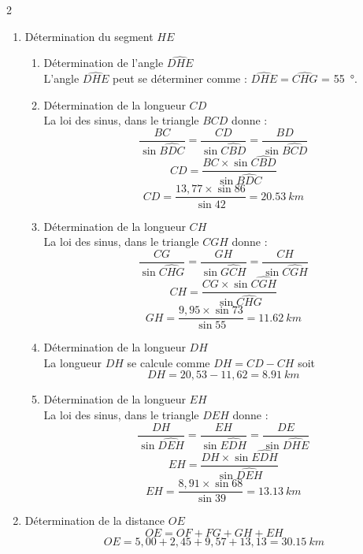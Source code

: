 \documentclass[a4paper,12pt,fleqn]{article}%
\begin{document}
\begin{multicols}{2}
\begin{enumerate}
    \item Détermination du segment $HE$
        \begin{enumerate}
            \item Détermination de l'angle $\widehat{DHE}$\\
            L'angle $\widehat{DHE}$ peut se déterminer comme : $\widehat{DHE} = \widehat{CHG}$ = \SI{55}{\degree}.
            \item Détermination de la longueur $CD$\\
            La loi des sinus, dans le triangle $BCD$ donne : $$\dfrac{BC}{\sin{\widehat{BDC}}}=\dfrac{CD}{\sin{\widehat{CBD}}}=\dfrac{BD}{\sin{\widehat{BCD}}}$$
            $$CD = \dfrac{BC \times \sin{\widehat{CBD}}}{\sin{\widehat{BDC}}}$$
            $$CD = \dfrac{13,77 \times \sin{86}}{\sin{42}} = \SI{20,53}{km}$$
            \item Détermination de la longueur $CH$\\
            La loi des sinus, dans le triangle $CGH$ donne : $$\dfrac{CG}{\sin{\widehat{CHG}}}=\dfrac{GH}{\sin{\widehat{GCH}}}=\dfrac{CH}{\sin{\widehat{CGH}}}$$
            $$CH=\dfrac{CG\times \sin{\widehat{CGH}}}{\sin{\widehat{CHG}}}$$
            $$GH=\dfrac{9,95\times \sin{73}}{\sin{55}}=\SI{11,62}{km}$$
            \item Détermination de la longueur $DH$\\
            La longueur $DH$ se calcule comme $DH=CD-CH$ soit $$DH = 20,53 - 11,62 = \SI{8,91}{km}$$
            \item Détermination de la longueur $EH$\\
            La loi des sinus, dans le triangle $DEH$ donne : $$\dfrac{DH}{\sin{\widehat{DEH}}} = \dfrac{EH}{\sin{\widehat{EDH}}} =\dfrac{DE}{\sin{\widehat{DHE}}}$$
            $$EH = \dfrac{DH \times \sin{\widehat{EDH}}}{\sin{\widehat{DEH}}}$$
            $$EH = \dfrac{8,91 \times \sin{68}}{\sin{39}} = \SI{13,13}{km}$$
        \end{enumerate}
    \item Détermination de la distance $OE$
        $$OE = OF + FG + GH+ EH$$
        $$OE = 5,00 + 2,45 + 9,57 + 13,13 = \SI{30,15}{km}$$
\end{enumerate}
\end{multicols}
\end{document}
